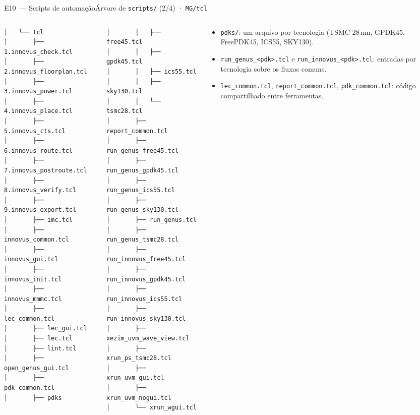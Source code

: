 \documentclass[aspectratio=169,10pt,t]{beamer}
\newcommand{\tmTree}{\fontsize{5.2}{6.1}\selectfont}
\begin{document}
\begin{frame}[fragile]{E10~— Scripts de automação}{Árvore de \texttt{scripts/} (2/4) · \texttt{MG/tcl}}
  \vspace*{-0.3cm}
  \begin{columns}[T]
    \begin{column}{0.32\textwidth}
\tmTree
\begin{verbatim}
│   └── tcl
│       ├── 1.innovus_check.tcl
│       ├── 2.innovus_floorplan.tcl
│       ├── 3.innovus_power.tcl
│       ├── 4.innovus_place.tcl
│       ├── 5.innovus_cts.tcl
│       ├── 6.innovus_route.tcl
│       ├── 7.innovus_postroute.tcl
│       ├── 8.innovus_verify.tcl
│       ├── 9.innovus_export.tcl
│       ├── imc.tcl
│       ├── innovus_common.tcl
│       ├── innovus_gui.tcl
│       ├── innovus_init.tcl
│       ├── innovus_mmmc.tcl
│       ├── lec_common.tcl
│       ├── lec_gui.tcl
│       ├── lec.tcl
│       ├── lint.tcl
│       ├── open_genus_gui.tcl
│       ├── pdk_common.tcl
│       ├── pdks
\end{verbatim}
    \end{column}
    \begin{column}{0.32\textwidth}
\tmTree
\begin{verbatim}
│       │   ├── free45.tcl
│       │   ├── gpdk45.tcl
│       │   ├── ics55.tcl
│       │   ├── sky130.tcl
│       │   └── tsmc28.tcl
│       ├── report_common.tcl
│       ├── run_genus_free45.tcl
│       ├── run_genus_gpdk45.tcl
│       ├── run_genus_ics55.tcl
│       ├── run_genus_sky130.tcl
│       ├── run_genus.tcl
│       ├── run_genus_tsmc28.tcl
│       ├── run_innovus_free45.tcl
│       ├── run_innovus_gpdk45.tcl
│       ├── run_innovus_ics55.tcl
│       ├── run_innovus_sky130.tcl
│       ├── xezim_uvm_wave_view.tcl
│       ├── xrun_ps_tsmc28.tcl
│       ├── xrun_uvm_gui.tcl
│       ├── xrun_uvm_nogui.tcl
│       └── xrun_wgui.tcl
\end{verbatim}
    \end{column}
    \begin{column}{0.32\textwidth}
      \vspace{0.2cm}
      \scriptsize
      \begin{itemize}
        \item \texttt{pdks/}: um arquivo por tecnologia (TSMC 28\,nm, GPDK45, FreePDK45, ICS55, SKY130).
        \item \texttt{run\_genus\_<pdk>.tcl} e \texttt{run\_innovus\_<pdk>.tcl}: entradas por tecnologia sobre os fluxos comuns.
        \item \texttt{lec\_common.tcl}, \texttt{report\_common.tcl}, \texttt{pdk\_common.tcl}: código compartilhado entre ferramentas.
      \end{itemize}
    \end{column}
  \end{columns}
\end{frame}
\end{document}
